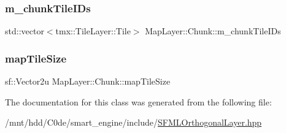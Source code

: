 \subsubsection{\texorpdfstring{m\+\_\+chunk\+Tile\+I\+Ds}{m\_chunkTileIDs}}
{\footnotesize\ttfamily std\+::vector$<$tmx\+::\+Tile\+Layer\+::\+Tile$>$ Map\+Layer\+::\+Chunk\+::m\+\_\+chunk\+Tile\+I\+Ds\hspace{0.3cm}{\ttfamily [private]}}

\mbox{\label{classMapLayer_1_1Chunk_a010215bc42e515278da75b680c88dcdf}} 
\subsubsection{\texorpdfstring{map\+Tile\+Size}{mapTileSize}}
{\footnotesize\ttfamily sf\+::\+Vector2u Map\+Layer\+::\+Chunk\+::map\+Tile\+Size\hspace{0.3cm}{\ttfamily [private]}}



The documentation for this class was generated from the following file\+:\begin{DoxyCompactItemize}
\item 
/mnt/hdd/\+C0de/smart\+\_\+engine/include/\hyperlink{SFMLOrthogonalLayer_8hpp}{S\+F\+M\+L\+Orthogonal\+Layer.\+hpp}\end{DoxyCompactItemize}

